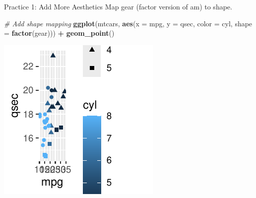 \documentclass[
  ignorenonframetext,
]{beamer}
\newenvironment{Shaded}{\begin{snugshade}}{\end{snugshade}}
\newcommand{\AttributeTok}[1]{\textcolor[rgb]{0.13,0.29,0.53}{#1}}
\newcommand{\CommentTok}[1]{\textcolor[rgb]{0.56,0.35,0.01}{\textit{#1}}}
\newcommand{\FunctionTok}[1]{\textcolor[rgb]{0.13,0.29,0.53}{\textbf{#1}}}
\newcommand{\NormalTok}[1]{#1}
\newcommand{\SpecialCharTok}[1]{\textcolor[rgb]{0.81,0.36,0.00}{\textbf{#1}}}
\begin{document}
\begin{frame}[fragile]{Practice 1: Add More Aesthetics}
\label{practice-1-add-more-aesthetics-1}
Map gear (factor version of am) to shape.


\begin{Shaded}
\begin{Highlighting}[]
\CommentTok{\# Add shape mapping}
\FunctionTok{ggplot}\NormalTok{(mtcars, }\FunctionTok{aes}\NormalTok{(}\AttributeTok{x =}\NormalTok{ mpg, }\AttributeTok{y =}\NormalTok{ qsec, }\AttributeTok{color =}\NormalTok{ cyl, }\AttributeTok{shape =} \FunctionTok{factor}\NormalTok{(gear))) }\SpecialCharTok{+}
    \FunctionTok{geom\_point}\NormalTok{()}
\end{Highlighting}
\end{Shaded}

\begin{center}\includegraphics[width=0.5\linewidth]{Figs/unnamed-chunk-26-1} \end{center}
\end{frame}
\end{document}
